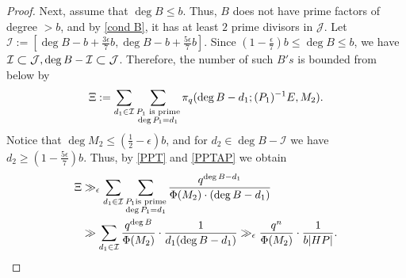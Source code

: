 \documentclass[12pt]{amsart}
\numberwithin{equation}{section}
\theoremstyle{definition}
\theoremstyle{remark}
\newcommand\bigsubset[1][1.19]{%
   \mathrel{\vcenter{\hbox{\scalebox{#1}{$\subset$}}}}}
\begin{document}
\begin{proof}
    Next, assume that $\deg B \leq b$. Thus, $B$ does not have prime factors of degree $>b$, and by \eqref{cond B}, it has at least $2$ prime divisors in $\mathcal{J}$. Let $\mathcal{I} := [\deg B - b + \frac{3\epsilon}{7}b, \deg B - b + \frac{5 \epsilon}{7}b]$. Since $(1-\frac{\epsilon}{7})b \leq \deg B \leq b$, we have $\mathcal{I} \bigsubset \mathcal{J}, \deg B - \mathcal{I} \bigsubset \mathcal{J}$.
    Therefore, the number of such $B's$ is bounded from below by
    \begin{equation*}
        \Xi := \sum_{d_1 \in \mathcal{I}}
        \sum_{\substack{P_1 \textnormal{ is prime} \\ \deg P_1 = d_1}} \pi_q(\deg B - d_1;(P_1)^{-1} E, M_2).
    \end{equation*}
    Notice that $\deg M_2 \leq (\frac{1}{2} - \epsilon)b$, and for $d_2 \in \deg B - \mathcal{I}$ we have $d_2 \geq (1-\frac{5\epsilon}{7})b$. Thus, by \eqref{PPT} and \eqref{PPTAP} we obtain
    \begin{align}
    \begin{split}
        \Xi &\gg_{\epsilon} \sum_{d_1 \in \mathcal{I}}
        \sum_{\substack{P_1 \textnormal{is prime} \\ \deg P_1 = d_1}} \frac{q^{\deg B - d_1}}{\Phi(M_2) \cdot (\deg B - d_1)}  \\ 
        &\gg \sum_{d_1 \in \mathcal{I}} \frac{q^{\deg B}}{\Phi(M_2)} \cdot \frac{1}{d_1(\deg B - d_1)}  
        \gg_{\epsilon} \frac{q^n}{\Phi(M_2)} \cdot \frac{1}{b|HP|}.
    \end{split}
    \end{align}


\end{proof}
\end{document}

